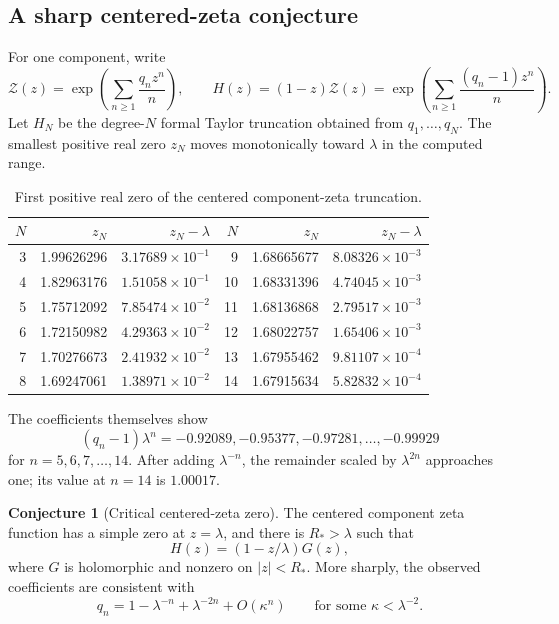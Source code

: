 \documentclass[11pt]{article}
\theoremstyle{definition}
\newtheorem{conjecture}[theorem]{Conjecture}
\theoremstyle{remark}
\newcommand{\cZ}{\mathcal Z}
\begin{document}
\subsection{A sharp centered-zeta conjecture}

For one component, write
\begin{equation}\label{eq:component-zeta}
 \cZ(z)=\exp\left(\sum_{n\ge1}\frac{q_nz^n}{n}\right),
 \qquad
 H(z)=(1-z)\cZ(z)
 =\exp\left(\sum_{n\ge1}\frac{(q_n-1)z^n}{n}\right).
\end{equation}
Let $H_N$ be the degree-$N$ formal Taylor truncation obtained from
$q_1,\ldots,q_N$.  The smallest positive real zero $z_N$ moves monotonically
toward $\lambda$ in the computed range.

\begin{table}[H]
\centering
\small
\caption{First positive real zero of the centered component-zeta truncation.}
\label{tab:zeta-zero}
\begin{tabular}{rrr@{\qquad}rrr}
\toprule
$N$ & $z_N$ & $z_N-\lambda$ & $N$ & $z_N$ & $z_N-\lambda$\\
\midrule
3 & 1.99626296 & $3.17689\times10^{-1}$ & 9  & 1.68665677 & $8.08326\times10^{-3}$\\
4 & 1.82963176 & $1.51058\times10^{-1}$ & 10 & 1.68331396 & $4.74045\times10^{-3}$\\
5 & 1.75712092 & $7.85474\times10^{-2}$ & 11 & 1.68136868 & $2.79517\times10^{-3}$\\
6 & 1.72150982 & $4.29363\times10^{-2}$ & 12 & 1.68022757 & $1.65406\times10^{-3}$\\
7 & 1.70276673 & $2.41932\times10^{-2}$ & 13 & 1.67955462 & $9.81107\times10^{-4}$\\
8 & 1.69247061 & $1.38971\times10^{-2}$ & 14 & 1.67915634 & $5.82832\times10^{-4}$\\
\bottomrule
\end{tabular}
\end{table}

The coefficients themselves show
\begin{equation}\label{eq:scaled-q}
 (q_n-1)\lambda^n
 =-0.92089,-0.95377,-0.97281,\ldots,-0.99929
\end{equation}
for $n=5,6,7,\ldots,14$.  After adding $\lambda^{-n}$, the remainder scaled
by $\lambda^{2n}$ approaches one; its value at $n=14$ is $1.00017$.

\begin{conjecture}[Critical centered-zeta zero]
\label{conj:sharp}
The centered component zeta function has a simple zero at $z=\lambda$, and
there is $R_*>\lambda$ such that
\begin{equation}\label{eq:sharp-conjecture}
 H(z)=(1-z/\lambda)G(z),
\end{equation}
where $G$ is holomorphic and nonzero on $|z|<R_*$.  More sharply, the observed
coefficients are consistent with
\begin{equation}\label{eq:q-sharp}
 q_n=1-\lambda^{-n}+\lambda^{-2n}+O(\kappa^n)
 \qquad\text{for some }\kappa<\lambda^{-2}.
\end{equation}
\end{conjecture}
\end{document}
